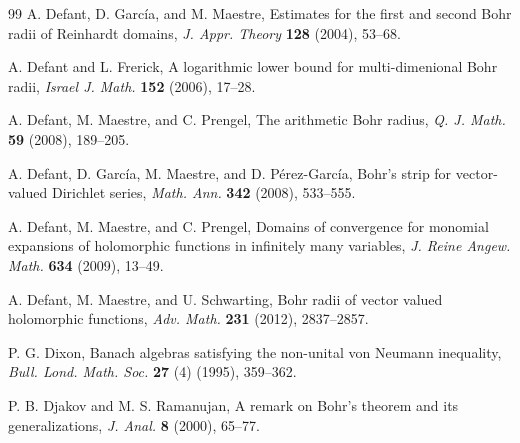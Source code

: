 \documentclass[a4paper,12pt]{amsart}
\theoremstyle{definition}
\begin{document}
\begin{thebibliography}{99}
	 {\sc A. Defant, D. Garc\'{i}a}, and {\sc  M. Maestre}, Estimates for the first and second Bohr radii of Reinhardt domains, {\it J. Appr. Theory} {\bf 128} (2004), 53--68.
	
	 {\sc A. Defant} and {\sc L. Frerick}, A logarithmic lower bound for multi-dimenional Bohr radii, {\it Israel J. Math.} {\bf 152} (2006), 17--28.
	
	 {\sc A. Defant,  M. Maestre}, and {\sc  C. Prengel}, The arithmetic Bohr radius, {\it Q. J. Math.} {\bf 59} (2008), 189--205.
	
	 {\sc A. Defant, D. Garc\'{i}a, M. Maestre}, and {\sc D. P\'{e}rez-Garc\'{i}a}, Bohr's strip for vector-valued Dirichlet series, {\it Math. Ann.} {\bf 342} (2008), 533--555.
	
	  {\sc A. Defant,  M. Maestre}, and {\sc  C. Prengel}, Domains of convergence for monomial expansions of holomorphic functions in infinitely many variables, {\it J. Reine Angew. Math.} {\bf 634} (2009), 13--49.
	
	
	 {\sc A. Defant, M. Maestre}, and {\sc  U. Schwarting}, Bohr radii of vector valued holomorphic functions, {\it Adv. Math.} {\bf 231} (2012), 2837--2857.
	
	
	
	
	
	 {\sc P. G. Dixon}, Banach algebras satisfying the non-unital von Neumann inequality, \textit{Bull. Lond. Math. Soc.} \textbf{27} (4) (1995), 359--362.
	
	 {\sc P. B. Djakov} and {\sc M. S. Ramanujan}, A remark on Bohr's theorem and its generalizations, \textit{J. Anal.} \textbf{8} (2000), 65--77.
	

\end{thebibliography}
\end{document}

